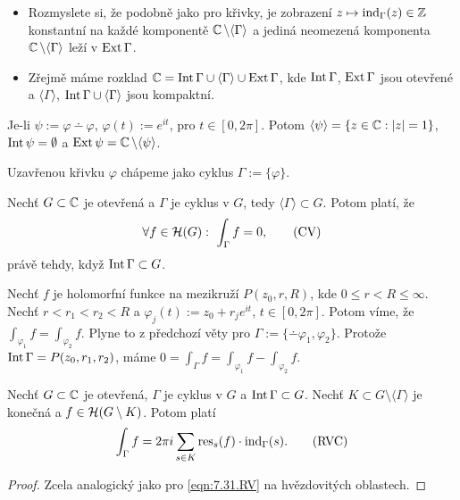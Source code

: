 \begin{note}
\begin{itemize}
    \item Rozmyslete si, že podobně jako pro křivky, je zobrazení $z\mapsto\operatorname{ind}_\Gamma(z)\in\operatorname{\mathbb{Z}}$ konstantní na každé komponentě $\operatorname{\mathbb{C}} \setminus\langle\Gamma\rangle$ a jediná neomezená komponenta $\operatorname{\mathbb{C}} \setminus\langle\Gamma\rangle$ leží v $\operatorname{Ext}\Gamma$.
    \item Zřejmě máme rozklad $\operatorname{\mathbb{C}} =\operatorname{Int}\Gamma\cup\langle\Gamma\rangle\cup\operatorname{Ext} \Gamma$, kde $\operatorname{Int} \Gamma$, $\operatorname{Ext} \Gamma$ jsou otevřené a $\langle\Gamma\rangle$, $\operatorname{Int} \Gamma\cup\langle\Gamma\rangle$ jsou kompaktní.
\end{itemize}
\end{note}

\begin{example}
Je-li $\psi:=\varphi\dotminus\varphi$, $\varphi(t):=e^{it}$, pro $t\in[0,2\pi]$. Potom $\langle\psi\rangle=\{z\in\operatorname{\mathbb{C}} : |z|=1\}$, $\operatorname{Int}\psi=\emptyset$ a $\operatorname{Ext}\psi=\operatorname{\mathbb{C}} \setminus\langle\psi\rangle$.
\end{example}

\begin{note}
Uzavřenou křivku $\varphi$ chápeme jako cyklus $\Gamma:=\{\varphi\}$.
\end{note}

\begin{theorem}\label{thm:obCapC}
Nechť $G\subset\operatorname{\mathbb{C}} $ je otevřená a $\Gamma$ je cyklus v $G$, tedy $\langle\Gamma\rangle\subset G$. Potom platí, že
\begin{equation}
    \forall f\in\Holo(G):\ \int_\Gamma f =0,
    \tag{CV}
    \label{eqn:7.30.cv}
\end{equation}
právě tehdy, když $\operatorname{Int}\Gamma\subset G$.
\end{theorem}

\begin{example}
Nechť $f$ je holomorfní funkce na mezikruží $P(z_0,r,R)$, kde $0\leq r<R\leq\infty$. Nechť $r<r_1<r_2<R$ a $\varphi_j(t):=z_0+r_je^{it}$, $t\in[0,2\pi]$. Potom víme, že $\int_{\varphi_1}f=\int_{\varphi_2}f$. Plyne to z předchozí věty pro $\Gamma:=\{\dotminus\varphi_1,\varphi_2\}$. Protože $\operatorname{Int}\Gamma=P(z_0,r_1,r_2)$, máme $0=\int_\Gamma f = \int_{\varphi_1}f-\int_{\varphi_2}f$.
\end{example}

\begin{theorem}
Nechť $G\subset\operatorname{\mathbb{C}}$ je otevřená, $\Gamma$ je cyklus v $G$ a $\operatorname{Int}\Gamma\subset G$. Nechť $K\subset G\setminus\langle\Gamma\rangle$ je konečná  a $f\in\operatorname{\mathcal{H}}(G\setminus K)$. Potom platí
\begin{equation}
    \int_\Gamma f = 2\pi i  \sum_{s\in K}\operatorname{res}_s(f)\cdot\operatorname{ind}_\Gamma(s).
    \tag{RVC}
    \label{eqn:9.8.rvc}
\end{equation}
\end{theorem}
\begin{proof}
Zcela analogický jako pro \cref{eqn:7.31.RV} na hvězdovitých oblastech.
\end{proof}
